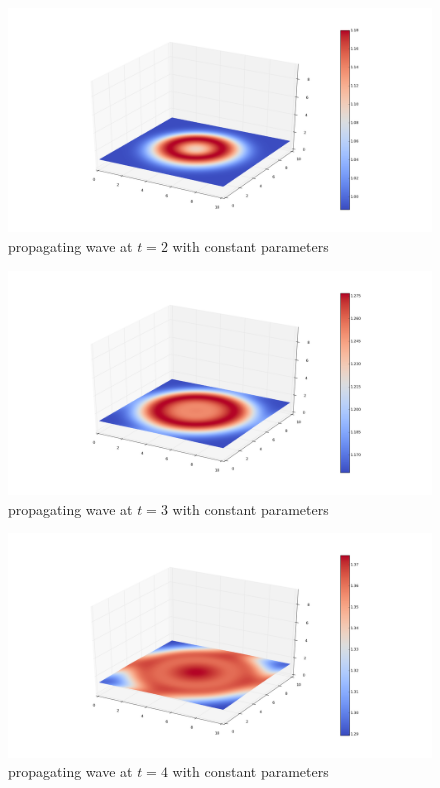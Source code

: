 \documentclass[10pt,a4paper]{report}
\begin{document}
\begin{figure}[h!]
  \caption{propagating wave at $t=2$ with constant parameters}
  \centering
    \includegraphics[width=1.5\textwidth]{t2.png}
\end{figure}

\begin{figure}[h!]
  \caption{propagating wave at $t=3$ with constant parameters}
  \centering
    \includegraphics[width=1.5\textwidth]{t3.png}
\end{figure}

\begin{figure}[h!]
  \caption{propagating wave at $t=4$ with constant parameters}
  \centering
    \includegraphics[width=1.5\textwidth]{t4.png}
\end{figure}
\end{document}
